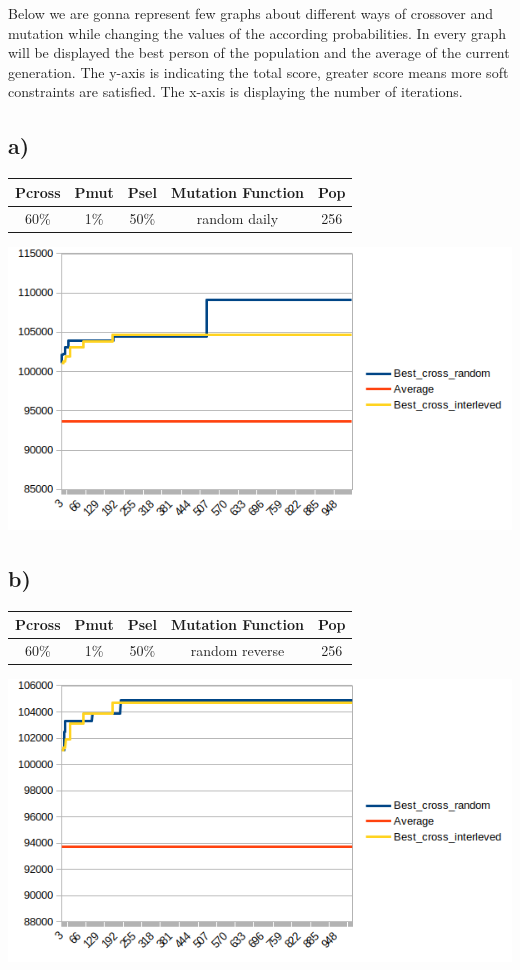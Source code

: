\documentclass{article}
\begin{document}
Below we are gonna represent few graphs about different ways of crossover and mutation while changing the values of the according probabilities. In every graph will be displayed the best person of the population and the average of the current generation. The y-axis is indicating the total score, greater score means more soft constraints are satisfied. The x-axis is displaying the number of iterations.

\subsection*{a)}

\begin{table}[!htb]
\centering
\begin{tabular}{|c|c|c|c|c|}
\hline
\textbf{Pcross} & \textbf{Pmut} & \textbf{Psel} & \textbf{Mutation Function} & \textbf{Pop} \\ \hline
60\% & 1\% & 50\% & random daily & 256 \\ \hline
\end{tabular}
\end{table}
\includegraphics[scale=0.75]{11}

\subsection*{b)}
\begin{table}[!htb]
\centering
\begin{tabular}{|c|c|c|c|c|}
\hline
\textbf{Pcross} & \textbf{Pmut} & \textbf{Psel} & \textbf{Mutation Function} & \textbf{Pop} \\ \hline
60\% & 1\% & 50\% & random reverse & 256 \\ \hline
\end{tabular}
\end{table}
\includegraphics[scale=0.75]{12}
\end{document}
